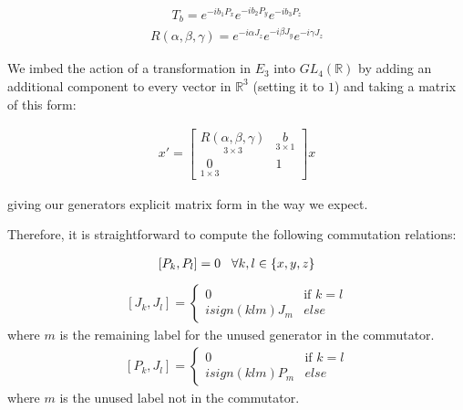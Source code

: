 \documentclass[10pt]{ucthesis}
\newcommand{\R}{\mathbb{R}}
\begin{document}
\begin{equation}
\begin{aligned}
	T_b = e^{-ib_1P_x}e^{-ib_2P_y}e^{-ib_3P_z}
\end{aligned}
\end{equation}
\begin{equation}
\begin{aligned}
	R(\alpha,\beta,\gamma) = e^{-i\alpha J_z}e^{-i\beta J_y}e^{-i\gamma J_z}
\end{aligned}
\end{equation}	

We imbed the action of a transformation in $E_3$ into $GL_4(\R)$ by adding an additional component to every vector in $\R^3$ (setting it to $1$) and taking a matrix of this form:

\begin{equation}
\begin{aligned}
	x' =
	\begin{bmatrix}
		\underset{3\times 3}{R(\alpha,\beta,\gamma)} & \underset{3\times 1}{b}\\
		\underset{1\times 3}{0} & 1
	\end{bmatrix} x
\end{aligned}
\end{equation}

giving our generators explicit matrix form in the way we expect.

Therefore, it is straightforward to compute the following commutation relations:

\begin{equation}
\begin{aligned}
	[P_k,P_l] = 0 \hspace{3mm} \forall k,l\in \{x,y,z\}
\end{aligned}
\end{equation}
\begin{equation}
\begin{aligned}
	[J_k,J_l] = \begin{cases}
					0 & \text{if } k = l\\
					isign(klm)J_m & else
					\end{cases}
\end{aligned}
\end{equation}
where $m$ is the remaining label for the unused generator in the commutator.
\begin{equation}
\begin{aligned}
	[P_k,J_l] = \begin{cases}
					0 & \text{if } k = l\\
					isign(klm)P_m & else \end{cases}
\end{aligned}
\end{equation}
where $m$ is the unused label not in the commutator.
\end{document}
